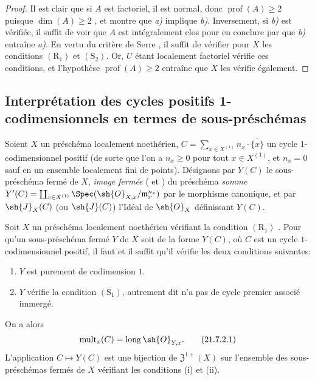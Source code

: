 \begin{proof}
Il est clair que si $A$ est factoriel, il est normal, donc $\operatorname{prof}(A)\geq2$ puisque $\dim(A)\geq2$ , et  montre que \emph{a)} implique \emph{b)}.
Inversement, si \emph{b)} est vérifiée, il suffit de voir que $A$ est intégralement clos pour en conclure par  que \emph{b)} entraîne \emph{a)}.
En vertu du critère de Serre , il suffit de vérifier pour $X$ les conditions $(\mathrm{R}_1)$ et $(\mathrm{S}_2)$.
Or, $U$ étant localement factoriel vérifie ces conditions, et l'hypothèse $\operatorname{prof}(A)\geq2$ entraîne que $X$ les vérifie également.
\end{proof}
\subsection{Interprétation des cycles positifs 1-codimensionnels en termes de sous-préschémas}
\label{IV.21.7}

\begin{env}[21.7.1]
\label{IV.21.7.1}
Soient $X$ un préschéma localement noethérien, $C=\sum_{x\in X^{(1)}}n_x\cdot\overline{\{x\}}$ un cycle $1$-codimensionnel positif (de sorte que l'on a $n_x\geq0$ pour tout $x\in X^{(1)}$, et $n_x=0$ sauf en un ensemble localement fini de points).
Désignons par $Y(C)$ le sous-préschéma fermé de $X$, \emph{image fermée} ( et ) du préschéma \emph{somme} $Y'(C)=\coprod_{x\in X^{(1)}}\Spec(\sh{O}_{X,x}/\mathfrak{m}_x^{n_x})$ par le morphisme canonique, et par $\sh{J}_X(C)$ (ou $\sh{J}(C)$) l'Idéal de $\sh{O}_X$ définissant $Y(C)$.
\end{env}

\begin{proposition}[21.7.2]
\label{IV.21.7.2}
Soit $X$ un préschéma localement noethérien vérifiant la condition $(\mathrm{R}_1)$ .
Pour qu'un sous-préschéma fermé $Y$ de $X$ soit de la forme $Y(C)$, où $C$ est un cycle $1$-codimensionnel positif, il faut et il suffit qu'il vérifie les deux conditions suivantes:
\begin{enumerate}[label=(\roman*)]
  \item $Y$ est purement de codimension $1$.
  \item $Y$ vérifie la condition $(\mathrm{S}_1)$, autrement dit  n'a pas de cycle premier associé immergé.
\end{enumerate}
On a alors
\[
\label{IV.21.7.2.1}
  \operatorname{mult}_x(C)=\operatorname{long}\sh{O}_{Y,x}.
  \tag{21.7.2.1}
\]
L'application $C\mapsto Y(C)$ est une bijection de $\mathfrak{Z}^{1+}(X)$ sur l'ensemble des sous-préschémas fermés de $X$ vérifiant les conditions (i) et (ii).
\end{proposition}

